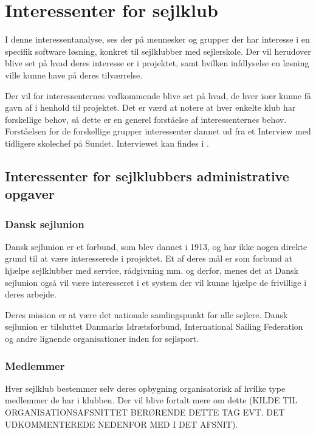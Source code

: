 \chapter{Interessenter for sejlklub}\label{chap:interessent-analyse-ved-sejlklubber}

I denne interessentanalyse, ses der på mennesker og grupper der har interesse i en specifik software løsning, konkret
til sejlklubber med sejlerskole. Der vil herudover blive set på hvad deres interesse er i projektet, samt hvilken
infdlyselse en løsning ville kunne have på deres tilværrelse.


Der vil for interessenternes vedkommende blive set på hvad, de hver især kunne få gavn af i henhold til projektet. 
Det er værd at notere at hver enkelte klub har forskellige behov, så dette er en generel forståelse af interessenternes
behov. Forståelsen for de forskellige grupper interessenter dannet ud fra et Interview med tidligere skolechef på
Sundet. Interviewet kan findes i .

\section{Interessenter for sejlklubbers administrative opgaver}

\subsection{Dansk sejlunion}

Dansk sejlunion er et forbund, som blev dannet i 1913, og har ikke nogen direkte grund til at være interesserede i
projektet.
Et af deres mål er som forbund at hjælpe sejlklubber med service, rådgivning mm. og derfor, menes det at Dansk sejlunion
også vil være interesseret i et system der vil kunne hjælpe de frivillige i deres arbejde.

Deres mission er at være det nationale samlingspunkt for alle sejlere. Dansk sejlunion er tilsluttet Danmarks
Idrætsforbund, International Sailing Federation og andre lignende organisationer inden for sejlsport.
\citep{Sejlsportdk}


\subsection{Medlemmer}

Hver sejlklub bestemmer selv deres opbygning organisatorisk af hvilke type medlemmer de har i klubben. Der vil blive
fortalt mere om dette (KILDE TIL ORGANISATIONSAFSNITTET BERØRENDE DETTE TAG EVT. DET UDKOMMENTEREDE NEDENFOR MED I DET
AFSNIT). 

